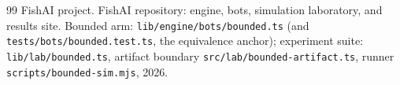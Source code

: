 \documentclass[11pt]{article}
\newcommand{\code}[1]{\texttt{#1}}
\begin{document}
\begin{thebibliography}{99}
FishAI project.
\newblock FishAI repository: engine, bots, simulation laboratory, and results site.
\newblock Bounded arm: \code{lib/engine/bots/bounded.ts} (and
\code{tests/bots/bounded.test.ts}, the equivalence anchor); experiment suite:
\code{lib/lab/bounded.ts}, artifact boundary \code{src/lab/bounded-artifact.ts},
runner \code{scripts/bounded-sim.mjs}, 2026.

\end{thebibliography}
\end{document}
